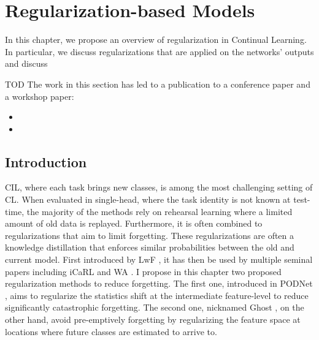 \chapter{Regularization-based Models}
\label{chapter:regularization}

\newcommand{\tableindent}{\,\,\,\,}
\newcommand{\vt}{\mathbf{t}}
\newcommand{\pp}{\,\textit{p.p}}
\newcommand{\std}{$\pm\,$}
\newcommand{\clf}{\textit{clf}}
\newcommand{\gray}[1]{{\color{darkgray}#1}}


\begin{chapabstract}
    In this chapter, we propose an overview of regularization in Continual Learning. In particular,
    we discuss regularizations that are applied on the networks' outputs and discuss


    TOD
    The work in this section has led to a publication to a conference paper and a workshop paper:

    \begin{itemize}
        \item {}
        \item {}
    \end{itemize}

\end{chapabstract}


\minitoc
{}


\section{Introduction}

\ac{CIL}, where each task brings new classes, is among the most challenging setting of \ac{CL}. When
evaluated in single-head, where the task identity is not known at test-time, the majority of the
methods rely on rehearsal learning where a limited amount of old data is replayed. Furthermore, it
is often combined to regularizations that aim to limit forgetting. These regularizations are often a
knowledge distillation \citep{hinton2015knowledge_distillation} that enforces similar probabilities
between the old and current model. First introduced by LwF \citep{li2018lwf}, it has then be used by
multiple seminal papers including iCaRL \citep{rebuffi2017icarl} and WA
\citep{zhao2020weightalignement}. I propose in this chapter two proposed regularization methods to
reduce forgetting. The first one, introduced in \ac{PODNet} \citep{douillard2020podnet}, aims to
regularize the statistics shift at the intermediate feature-level to reduce significantly
catastrophic forgetting. The second one, nicknamed Ghost \citep{douillard2020ghost}, on the other
hand, avoid pre-emptively forgetting by regularizing the feature space at locations where future
classes are estimated to arrive to.

